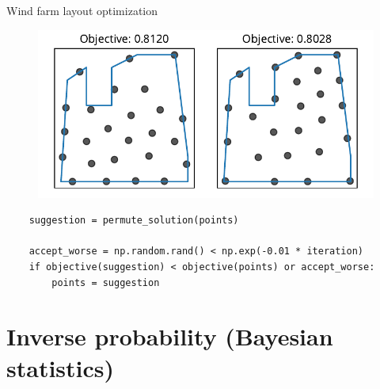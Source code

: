 \documentclass[12pt, aspectratio=149]{beamer}
\theoremstyle{plain}
\begin{document}
\begin{frame}[fragile]{Wind farm layout optimization}
\vspace*{-1em}
\begin{center}
 \begin{figure}
    	\centering
    	\includegraphics[width=0.99\linewidth]{figures/windfarm_sa}
 \end{figure}
 \end{center}
\vspace*{-2em}
\begin{center}
\begin{verbatim}
    suggestion = permute_solution(points)

    accept_worse = np.random.rand() < np.exp(-0.01 * iteration)
    if objective(suggestion) < objective(points) or accept_worse:
        points = suggestion
\end{verbatim}
\end{center}
\end{frame}




\section{Inverse probability (Bayesian statistics)}
\end{document}
